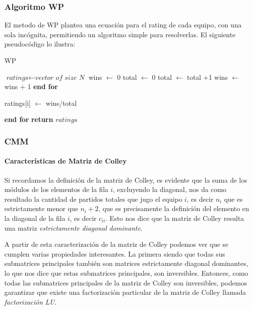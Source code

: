 \documentclass[a4paper]{article}
\begin{document}
\subsubsection{Algoritmo WP}

El metodo de WP plantea una ecuación para el rating de cada equipo, con una sola incógnita, permitiendo un algoritmo simple para resolverlas. El siguiente pseudocódigo lo ilustra:

\begin{algorithm}
\caption{WP}\label{wp}
\begin{algorithmic}[1]
\State $\textit{ratings} \gets \textit{vector of size N}$
    \State wins $\gets$ 0
    \State total $\gets$ 0
	        \State total $\gets$ total +1
	            \State wins $\gets$ wins + 1
\State\textbf{end for}
    
	\State ratings[i] $\gets$ wins/total

\State\textbf{end for}
\State \textbf{return} $\textit{ratings}$
\EndProcedure
\end{algorithmic}
\end{algorithm}

\subsubsection{CMM}

\paragraph{Características de Matriz de Colley}

Si recordamos la definición de la matriz de Colley, es evidente que la suma de los módulos de los elementos de la fila $i$, excluyendo la diagonal, nos da como resultado la cantidad de partidos totales que jugo el equipo $i$, es decir $n_{i}$ que es estrictamente menor que $n_{i} + 2$, que es precisamente la definición del elemento en la diagonal de la fila $i$, es decir $c_{ii}$. Esto nos dice que la matriz de Colley resulta una matriz \emph{estrictamente diagonal dominante}.

A partir de esta caracterización de la matriz de Colley podemos ver que se cumplen varias propiedades interesantes. La primera siendo que todas sus submatrices principales también son matrices estrictamente diagonal dominantes, lo que nos dice que estas submatrices principales, son inversibles. Entonces, como todas las submatrices principales de la matriz de Colley son inversibles, podemos garantizar que existe una factorización particular de la matriz de Colley llamada \emph{factorización LU}.
\end{document}
